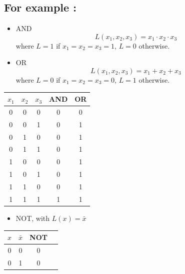 \documentclass[12pt,openany, tikz,border=10pt]{book}
\begin{document}
			      	\subsection*{For example :}
			      	\vspace*{-2px}
			      	\begin{itemize}
			      		\item[] AND
			      		      \vspace*{-5px}
			      		      \begin{equation*}
			      		      	L(x_1, x_2, x_3) = x_1 \cdot x_2 \cdot x_3
			      		      \end{equation*}
			      		      where \( L = 1 \) if \( x_1 = x_2 = x_3 = 1 \), \( L = 0 \) otherwise.
			      		      \vspace*{-5px}
			      		\item[] OR
			      		      \begin{equation*}
			      		      	L(x_1, x_2, x_3) = x_1 + x_2 + x_3
			      		      \end{equation*}
			      		      where \( L = 0 \) if \( x_1 = x_2 = x_3 = 0 \), \( L = 1 \) otherwise.
			      	\end{itemize}
			      	
			      	\begin{center}
			      		\begin{tabular}{ c c c | c | c }
			      			
			      			\( x_1 \) & \( x_2 \) & \( x_3 \) & AND & OR \\
			      			\hline
			      			0         & 0         & 0         & 0   & 0  \\
			      			0         & 0         & 1         & 0   & 1  \\
			      			0         & 1         & 0         & 0   & 1  \\
			      			0         & 1         & 1         & 0   & 1  \\
			      			1         & 0         & 0         & 0   & 1  \\
			      			1         & 0         & 1         & 0   & 1  \\
			      			1         & 1         & 0         & 0   & 1  \\
			      			1         & 1         & 1         & 1   & 1  \\
			      		\end{tabular}
			      	\end{center}
			      	\begin{itemize}
			      		\item[] NOT, with $L(x) = \bar{x}$      
			      	\end{itemize}
			      	\begin{center}
			      		\begin{tabular}{ c c | c | c }
			      			\( x \) & \( \bar{x} \) & NOT \\
			      			\hline
			      			0       & 0             & 0   \\
			      			0       & 1             & 0   \\
			      		\end{tabular}
			      	\end{center}
			      	
\end{document}
